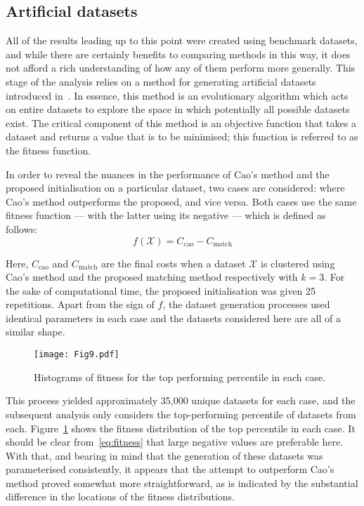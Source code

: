 \subsection{Artificial datasets}\label{subsec:artificial}

All of the results leading up to this point were created using benchmark
datasets, and while there are certainly benefits to comparing methods in this
way, it does not afford a rich understanding of how any of them perform more
generally. This stage of the analysis relies on a method for generating
artificial datasets introduced in~\cite{Wilde2019}. In essence, this method is
an evolutionary algorithm which acts on entire datasets to explore the space in
which potentially all possible datasets exist. The critical component of this
method is an objective function that takes a dataset and returns a value that is
to be minimised; this function is referred to as the fitness function.

In order to reveal the nuances in the performance of Cao's method and the
proposed initialisation on a particular dataset, two cases are considered: where
Cao's method outperforms the proposed, and vice versa. Both cases use the same
fitness function --- with the latter using its negative --- which is defined as
follows:
\begin{equation}\label{eq:fitness}
    f\left(\mathcal X\right) = C_{\mathrm{cao}} - C_{\mathrm{match}}
\end{equation}

Here, \(C_{\mathrm{cao}}\) and \(C_{\mathrm{match}}\) are the final costs when a
dataset \(\mathcal X\) is clustered using Cao's method and the proposed matching
method respectively with \(k = 3\). For the sake of computational time, the
proposed initialisation was given 25 repetitions. Apart from the sign of \(f\),
the dataset generation processes used identical parameters in each case and the
datasets considered here are all of a similar shape.

\begin{figure}
    \centering
    \texttt{[image: Fig9.pdf]}
    \caption{%
        Histograms of fitness for the top performing percentile in each case.
    }\label{fig:fitness}
\end{figure}

This process yielded approximately 35,000 unique datasets for each case, and the
subsequent analysis only considers the top-performing percentile of datasets
from each. Figure~\ref{fig:fitness} shows the fitness distribution of the top
percentile in each case. It should be clear from~\eqref{eq:fitness} that large
negative values are preferable here. With that, and bearing in mind that the
generation of these datasets was parameterised consistently, it appears that the
attempt to outperform Cao's method proved somewhat more straightforward, as is
indicated by the substantial difference in the locations of the fitness
distributions.


